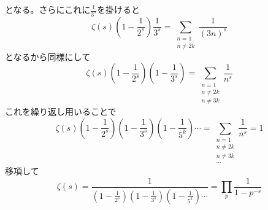 \documentclass{jsarticle}
\begin{document}
となる。さらにこれに\(\frac{1}{3^{s}}\)を掛けると
\[
\zeta(s)\left(1-\frac{1}{2^{s}}\right)\frac{1}{3^{s}}=\sum_{\substack{n=1\\n\neq 2k}}\frac{1}{(3n)^{s}}
\]
となるから同様にして
\[\zeta(s)\left(1-\frac{1}{2^{s}}\right)\left(1-\frac{1}{3^{s}}\right)=\sum_{\substack{n=1\\n\neq2k\\n\neq3k}}\frac{1}{n^{s}}\]
これを繰り返し用いることで
\[\zeta(s)\left(1-\frac{1}{2^{s}}\right)\left(1-\frac{1}{3^{s}}\right)\left(1-\frac{1}{5^{k}}\right)\cdots=\sum_{\substack{n=1\\n\neq2k\\n\neq3k\\ \cdots}}\frac{1}{n^{s}}=1\]
移項して
\[\zeta(s)=\frac{1}{\left(1-\frac{1}{2^{s}}\right)\left(1-\frac{1}{3^{s}}\right)\left(1-\frac{1}{5^{k}}\right)\cdots}=\prod_{p}\frac{1}{1-p^{-s}}\]





\setcounter{equation}{0}
\end{document}
